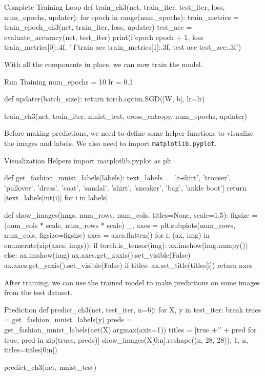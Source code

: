 \begin{pythoncode}{Complete Training Loop}
def train_ch3(net, train_iter, test_iter, loss, num_epochs, updater):
    for epoch in range(num_epochs):
        train_metrics = train_epoch_ch3(net, train_iter, loss, updater)
        test_acc = evaluate_accuracy(net, test_iter)
        print(f'epoch {epoch + 1}, loss {train_metrics[0]:.4f}, '
              f'train acc {train_metrics[1]:.3f}, test acc {test_acc:.3f}')
\end{pythoncode}

With all the components in place, we can now train the model.

\begin{pythoncode}{Run Training}
num_epochs = 10
lr = 0.1

def updater(batch_size):
    return torch.optim.SGD([W, b], lr=lr)

train_ch3(net, train_iter, mnist_test, cross_entropy, num_epochs, updater)
\end{pythoncode}

Before making predictions, we need to define some helper functions to visualize the images and labels. We also need to import \texttt{matplotlib.pyplot}.

\begin{pythoncode}{Visualization Helpers}
import matplotlib.pyplot as plt

def get_fashion_mnist_labels(labels):
    text_labels = ['t-shirt', 'trouser', 'pullover', 'dress', 'coat',
                   'sandal', 'shirt', 'sneaker', 'bag', 'ankle boot']
    return [text_labels[int(i)] for i in labels]

def show_images(imgs, num_rows, num_cols, titles=None, scale=1.5):
    figsize = (num_cols * scale, num_rows * scale)
    _, axes = plt.subplots(num_rows, num_cols, figsize=figsize)
    axes = axes.flatten()
    for i, (ax, img) in enumerate(zip(axes, imgs)):
        if torch.is_tensor(img):
            ax.imshow(img.numpy())
        else:
            ax.imshow(img)
        ax.axes.get_xaxis().set_visible(False)
        ax.axes.get_yaxis().set_visible(False)
        if titles:
            ax.set_title(titles[i])
    return axes
\end{pythoncode}

After training, we can use the trained model to make predictions on some images from the test dataset.

\begin{pythoncode}{Prediction}
def predict_ch3(net, test_iter, n=6):
    for X, y in test_iter:
        break
    trues = get_fashion_mnist_labels(y)
    preds = get_fashion_mnist_labels(net(X).argmax(axis=1))
    titles = [true +'\n' + pred for true, pred in zip(trues, preds)]
    show_images(X[0:n].reshape((n, 28, 28)), 1, n, titles=titles[0:n])

predict_ch3(net, mnist_test)
\end{pythoncode}

